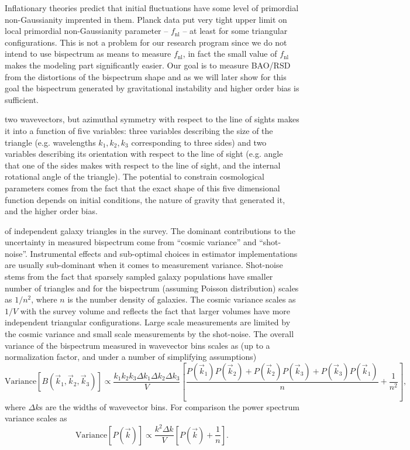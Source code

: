 Inflationary theories predict that initial fluctuations have some level of
primordial non-Gaussianity imprented in them. Planck data put very tight upper
limit on local primordial non-Gaussianity parameter -- $f_\mathrm{nl}$ -- at
least for some triangular configurations. This is not a problem for our
research program since we do not intend to use bispectrum as means to measure
$f_\mathrm{nl}$, in fact the small value of $f_\mathrm{nl}$ makes the modeling
part significantly easier. Our goal is to measure BAO/RSD from the distortions
of the bispectrum shape and as we will later show for this goal the bispectrum
generated by gravitational instability and higher order bias is sufficient.

two wavevectors, but azimuthal symmetry with respect to the line of sights
makes it into a function of five variables: three variables describing the
size of the triangle (e.g. wavelengths $k_1, k_2, k_3$ corresponding to three
sides) and two variables describing its orientation with respect to the line
of sight (e.g. angle that one of the sides makes with respect to the line of
sight, and the internal rotational angle of the triangle). The potential to
constrain cosmological parameters comes from the fact that the exact shape of
this  five dimensional function depends on initial conditions, the nature of
gravity that generated it, and the higher order bias.

of independent galaxy triangles in the survey. The dominant contributions to
the uncertainty in measured bispectrum come from ``cosmic variance'' and
``shot-noise''. Instrumental effects and sub-optimal choices in estimator
implementations are usually sub-dominant when it comes to measurement
variance. Shot-noise stems from the fact that sparsely sampled galaxy
populations have smaller number of triangles and for the bispectrum (assuming
Poisson distribution) scales as  $1/n^2$, where $n$ is the number density of
galaxies. The cosmic variance scales as $1/V$ with the survey volume and
reflects the fact that larger volumes have more independent triangular
configurations. Large scale measurements are limited by the cosmic variance
and small scale measurements by the shot-noise. The overall variance of the
bispectrum measured in wavevector bins scales as (up to a normalization
factor, and under a number of simplifying assumptions)  \begin{equation}
\mathrm{Variance}\left[B(\vec{k}_1,\vec{k}_2,\vec{k}_3)\right] \propto
\frac{k_1k_2k_3\Delta k_1\Delta k_2\Delta
k_3}{V}\left[\frac{P(\vec{k}_1)P(\vec{k}_2) + P(\vec{k}_2)P(\vec{k}_3) +
P(\vec{k}_3)P(\vec{k}_1)}{n} + \frac{1}{n^2}\right], \end{equation} where
$\Delta k$s are the widths of wavevector bins. For comparison the power
spectrum variance scales as \begin{equation}
\mathrm{Variance}\left[P(\vec{k})\right] \propto \frac{k^2\Delta
k}{V}\left[P(\vec{k}) + \frac{1}{n}\right].  
\end{equation}  

